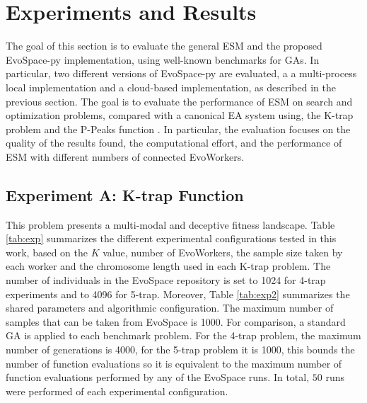 \section{Experiments and Results}
\label{sec:exp1}
The goal of this section is to evaluate the general ESM and the proposed EvoSpace-py implementation, using well-known benchmarks for GAs.
In particular, two different versions of EvoSpace-py are evaluated, a a multi-process local implementation and a cloud-based implementation, as described in the
previous section.
The goal is to evaluate the performance of ESM on search and optimization problems, compared with a canonical EA system using,
the K-trap problem \cite{trap} and the P-Peaks function
\cite{Jong:PS97}. In particular, the evaluation focuses on the quality of the results found, the computational effort, and the performance of ESM with different numbers
of connected EvoWorkers.

\subsection{Experiment A: K-trap Function}
This problem presents a multi-modal and deceptive fitness landscape.
Table \ref{tab:exp} summarizes the different experimental configurations tested in this work, based on the $K$ value, number of EvoWorkers, the sample size taken by each worker and the chromosome length used in each K-trap problem. The number of individuals in the EvoSpace repository is set to 1024 for 4-trap experiments and to 4096 for 5-trap.
Moreover, Table \ref{tab:exp2} summarizes the shared parameters and algorithmic configuration.
The maximum number of samples that can be taken from EvoSpace is 1000.
For comparison, a standard GA is applied to each benchmark problem.
For the 4-trap problem, the maximum number of generations is 4000, for the 5-trap problem it is 1000,
this bounds the number of function evaluations so it is equivalent to the maximum number of function evaluations performed by any of the EvoSpace runs.
In total, $50$ runs were performed of each experimental configuration.


